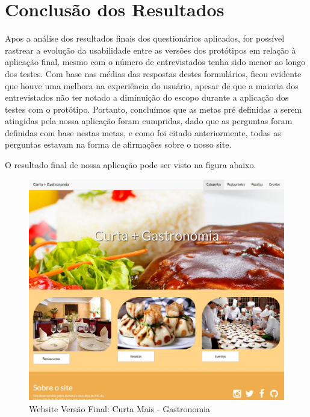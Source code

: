 \chapter[Conclusão dos Resultados]{Conclusão dos Resultados}

Apos a análise dos resultados finais dos questionários aplicados, for possível rastrear a evolução da usabilidade entre as versões dos protótipos em relação à aplicação final, mesmo com o número de entrevistados tenha sido menor ao longo dos testes. Com base nas médias das respostas destes formulários, ficou evidente que houve uma melhora na experiência do usuário, apesar de que a maioria dos entrevistados não ter notado a diminuição do escopo durante a aplicação dos testes com o protótipo. Portanto, concluímos que as metas pré definidas a serem atingidas pela nossa aplicação foram cumpridas, dado que as perguntas foram definidas com base nestas metas, e como foi citado anteriormente, todas as perguntas estavam na forma de afirmações sobre o nosso site.

	O resultado final de nossa aplicação pode ser visto na figura abaixo.
	
\begin{figure}[H]
	\begin{center}
		\includegraphics[keepaspectratio,scale=0.5]{figuras/aplicacao_final.eps}
		\caption{Website Versão Final: Curta Mais - Gastronomia}
	\end{center}
\end{figure}